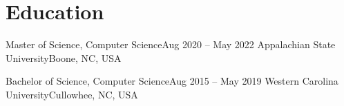 \section{Education}
\mySubHeadingListStart

  \mySubHeading
    {Master of Science, Computer Science}{Aug 2020 -- May 2022}
    { Appalachian State University}{Boone, NC, USA}
    \myItemListStart
    \myItemListEnd

  \mySubHeading
    {Bachelor of Science, Computer Science}{Aug 2015 -- May 2019}
    { Western Carolina University}{Cullowhee, NC, USA}
    \myItemListStart
    \myItemListEnd

\mySubHeadingListEnd
